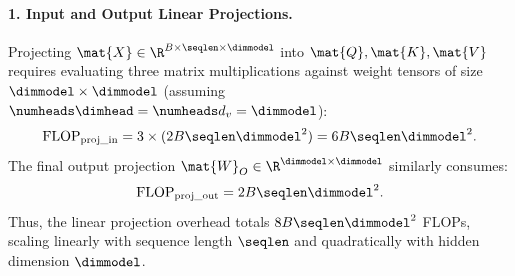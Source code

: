 \paragraph{1. Input and Output Linear Projections.}
Projecting $\mat{X} \in \R^{B \times \seqlen \times \dimmodel}$ into $\mat{Q}, \mat{K}, \mat{V}$ requires evaluating three matrix multiplications against weight tensors of size $\dimmodel \times \dimmodel$ (assuming $\numheads \dimhead = \numheads d_v = \dimmodel$):
\begin{equation}
\operatorname{FLOP}_{\text{proj\_in}} = 3 \times (2 B \seqlen \dimmodel^2) = 6 B \seqlen \dimmodel^2.
\end{equation}
The final output projection $\mat{W}_O \in \R^{\dimmodel \times \dimmodel}$ similarly consumes:
\begin{equation}
\operatorname{FLOP}_{\text{proj\_out}} = 2 B \seqlen \dimmodel^2.
\end{equation}
Thus, the linear projection overhead totals $8 B \seqlen \dimmodel^2$ FLOPs, scaling linearly with sequence length $\seqlen$ and quadratically with hidden dimension $\dimmodel$.

